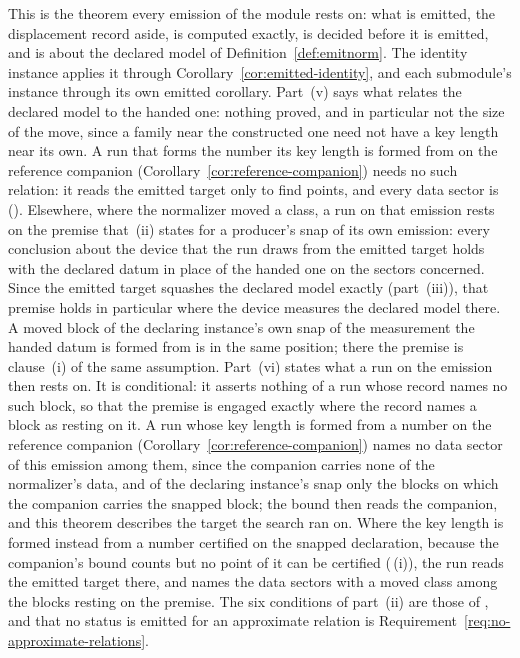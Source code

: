 This is the theorem every emission of the module rests on: what is emitted,
the displacement record aside, is computed exactly, is decided before it is
emitted, and is about the declared model of Definition~\ref{def:emitnorm}.
The identity instance applies it through
Corollary~\ref{cor:emitted-identity}, and each submodule's instance through
its own emitted corollary. Part~(v) says what relates the declared model to
the handed one: nothing proved, and in particular not the size of the move,
since a family near the constructed one need not have a key length near its
own. A run that forms the number its key length is formed from on the
reference companion (Corollary~\ref{cor:reference-companion}) needs no such
relation: it reads
the emitted target only to find points, and every data sector is
 ().
Elsewhere, where the normalizer moved a class, a run on that emission rests
on the premise that \,(ii) states
for a producer's snap of its own emission: every conclusion about the device
that the run draws from the emitted target holds with the declared datum in
place of the handed one on the sectors concerned. Since the emitted target
squashes the declared model exactly (part~(iii)), that premise holds in
particular where the device measures the declared model there. A moved
block of the declaring instance's own snap of the measurement the handed
datum is formed from is in the same position; there the premise is
clause~(i) of the same assumption.
Part~(vi) states what a run on the emission then rests on. It is
conditional: it asserts nothing of a run whose record names no such block,
so that the premise is engaged exactly where the record names a block as
resting on it. A run whose key length is formed from a number on the
reference companion (Corollary~\ref{cor:reference-companion}) names no data
sector of this emission among them, since the companion carries none of the
normalizer's data, and of the declaring instance's snap only the blocks on
which the companion carries the snapped block; the bound then reads the
companion, and this theorem describes the target the search ran on.
Where the key length is formed instead from a number certified on the
snapped declaration, because the companion's bound counts but no point of it
can be certified (\,(i)),
the run reads the emitted target there, and names the data sectors with a
moved class among the blocks resting on the premise. The six conditions of part~(ii) are those of
, and that no status is emitted for an
approximate relation is Requirement~\ref{req:no-approximate-relations}.

